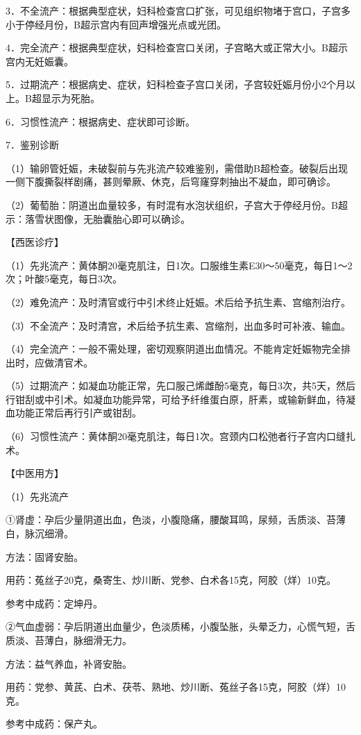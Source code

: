 \documentclass[12pt,UTF8,openany]{ctexbook}
\begin{document}
3．不全流产：根据典型症状，妇科检查宫口扩张，可见组织物堵于宫口，子宫多小于停经月份，B超示宫内有回声增强光点或光团。

4．完全流产：根据典型症状，妇科检查宫口关闭，子宫略大或正常大小。B超示宫内无妊娠囊。

5．过期流产：根据病史、症状，妇科检查子宫口关闭，子宫较妊娠月份小2个月以上。B超显示为死胎。

6．习惯性流产：根据病史、症状即可诊断。

7．鉴别诊断

（1）输卵管妊娠，未破裂前与先兆流产较难鉴别，需借助B超检查。破裂后出现一侧下腹撕裂样剧痛，甚则晕厥、休克，后穹窿穿刺抽出不凝血，即可确诊。

（2）葡萄胎：阴道出血量较多，有时混有水泡状组织，子宫大于停经月份。B超示：落雪状图像，无胎囊胎心即可以确诊。

【西医诊疗】

（1）先兆流产：黄体酮20毫克肌注，日1次。口服维生素E30～50毫克，每日1～2次；叶酸5毫克，每日3次。

（2）难免流产：及时清官或行中引术终止妊娠。术后给予抗生素、宫缩剂治疗。

（3）不全流产：及时清宫，术后给予抗生素、宫缩剂，出血多时可补液、输血。

（4）完全流产：一般不需处理，密切观察阴道出血情况。不能肯定妊娠物完全排出时，应做清官术。

（5）过期流产：如凝血功能正常，先口服己烯雌酚5毫克，每日3次，共5天，然后行钳刮或中引术。如凝血功能异常，可给予纤维蛋白原，肝素，或输新鲜血，待凝血功能正常后再行引产或钳刮。

（6）习惯性流产：黄体酮20毫克肌注，每日1次。宫颈内口松弛者行子宫内口缝扎术。

【中医用方】

（1）先兆流产

①肾虚：孕后少量阴道出血，色淡，小腹隐痛，腰酸耳鸣，尿频，舌质淡、苔薄白，脉沉细滑。

方法：固肾安胎。

用药：菟丝子20克，桑寄生、炒川断、党参、白术各15克，阿胶（烊）10克。

参考中成药：定坤丹。

②气血虚弱：孕后阴道出血量少，色淡质稀，小腹坠胀，头晕乏力，心慌气短，舌质淡、苔薄白，脉细滑无力。

方法：益气养血，补肾安胎。

用药：党参、黄芪、白术、茯苓、熟地、炒川断、菟丝子各15克，阿胶（烊）10克。

参考中成药：保产丸。
\end{document}

